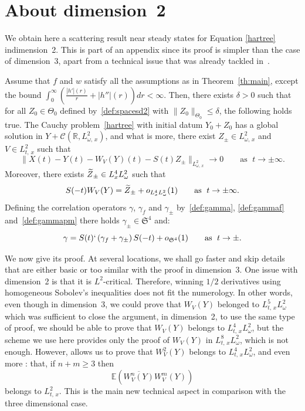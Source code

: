 \documentclass[AHL, Unicode, longabstracts,published]{cedram}
\newcommand{\R}{\mathbb{R}}
\newcommand{\E}{\mathbb{E}}
\newcommand{\mclC}{\mathcal{C}}
\newcommand{\frkS}{\mathfrak{S}}
\let\oldtilde\tilde
\renewcommand*{\tilde}[1]{\mathchoice{\widetilde{#1}}{\widetilde{#1}}{\oldtilde{#1}}{\oldtilde{#1}}}
\begin{document}
\appendix

\section{About dimension~2}\label{sec:dim2}


We obtain here a scattering result near steady states for Equation \eqref{hartree} in\linebreak dimension~2. This is part of an appendix since its proof is simpler than the case of dimension~3, apart from a technical issue that was already tackled in~\cite{FLLS,lewsab2}.

\begin{theo}\label{th:dim2}
Assume that $f$ and $w$ satisfy all the assumptions as in Theorem~\ref{th:main}, except the bound $\int_0^\infty (\tfrac{|h'|(r)}{r}+|h''|(r))dr<\infty$. Then, there exists $\delta >0$ such that for all $Z_0 \in \Theta_0$ defined by~\eqref{def:spacesd2} with $\| Z_0 \|_{\Theta_0}\leq \delta$, the following holds true. The Cauchy problem~\eqref{hartree} with initial datum $Y_0+Z_0$ has a global solution in $Y + \mclC (\R, L^2_{\omega,\,x})$, and what is more, there exist $Z_\pm \in L^2_{\omega,\,x}$ and $V\in L^{2}_{t,\,x}$ such that
\begin{equation} \label{id:scatteringd=2}
\big\|X(t) - Y(t) - W_V(Y)(t)-S(t) Z_\pm\big\|_{L^2_{\omega,\,x}} \rightarrow 0 \quad \quad \text{as }\; t\rightarrow \pm \infty.
\end{equation}
Moreover, there exists $\tilde Z_\pm \in L^4_x L^2_\omega$ such that
\[
S(-t)W_V(Y) = \tilde Z_\pm + o_{L^4_x L^2_\omega} (1) \quad \quad \text{as }\; t\rightarrow \pm \infty.
\]
Defining the correlation operators $\gamma$, $\gamma_f$ and $\gamma_\pm$ by~\eqref{def:gamma}, \eqref{def:gammaf} and~\eqref{def:gammapm} there holds $\gamma_\pm \in \frkS^{4}$ and:
\begin{equation} \label{id:scatteringdensityd=2}
\gamma=S(t)`\left(\gamma_f+\gamma_\pm\right)S(-t)+o_{\frkS^4}(1) \quad \quad \text{as }\; t\rightarrow \pm.
\end{equation}
\end{theo}


We now give its proof. At several locations, we shall go faster and skip details that are either basic or too similar with the proof in dimension~3. One issue with dimension~2 is that it is $L^2$-critical. Therefore, winning $1/2$ derivatives using homogeneous Sobolev's inequalities does not fit the numerology. In other words, even though in dimension~3, we could prove that $W_V(Y)$ belonged to $L^5_{t,\,x} L^2_\omega$ which was sufficient to close the argument, in dimension~2, to use the same type of proof, we should be able to prove that $W_V(Y)$ belongs to $L^4_{t,\,x} L^2_\omega$, but the scheme we use here provides only the proof of $W_V(Y)$ in $L^8_{t,\,x} L^2_\omega$, which is not enough. However, \cite[Lemma~3 in Section~4]{lewsab2} allows us to prove that $W_V^2(Y)$ belongs to $L^4_{t,\,x} L^2_\omega$, and even more : that, if $n+m \geq 3$ then
\[
\E\left(\overline{W_V^n(Y)} W_V^m(Y)\right)
\]
belongs to $L^2_{t,\,x}$. This is the main new technical aspect in comparison with the three dimensional case.
\end{document}
